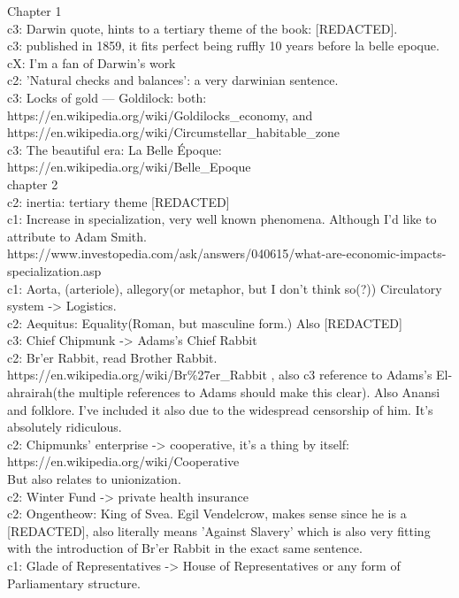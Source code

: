Chapter 1\\[1cm]
c3: Darwin quote, hints to a tertiary theme of the book: [REDACTED].\\
c3: published in 1859, it fits perfect being ruffly 10 years before la belle epoque.\\
cX: I'm a fan of Darwin's work\\
c2: 'Natural checks and balances': a very darwinian sentence.\\
c3: Locks of gold --- Goldilock: both: https://en.wikipedia.org/wiki/Goldilocks\_economy, and https://en.wikipedia.org/wiki/Circumstellar\_habitable\_zone\\
c3: The beautiful era: La Belle Époque: https://en.wikipedia.org/wiki/Belle\_Epoque\\[1cm]
chapter 2 \\
c2: inertia: tertiary theme [REDACTED]\\
c1: Increase in specialization, very well known phenomena. Although I'd like to attribute to Adam Smith.\\ https://www.investopedia.com/ask/answers/040615/what-are-economic-impacts-specialization.asp\\
c1: Aorta, (arteriole), allegory(or metaphor, but I don't think so(?)) Circulatory system -> Logistics.\\
c2: Aequitus: Equality(Roman, but masculine form.) Also [REDACTED]\\
c3: Chief Chipmunk -> Adams's Chief Rabbit\\
c2: Br'er Rabbit, read Brother Rabbit.\\ https://en.wikipedia.org/wiki/Br\%27er\_Rabbit , also c3 reference to Adams's El-ahrairah(the multiple references to Adams should make this clear). Also Anansi and folklore. I've included it also due to the widespread censorship of him. It's absolutely ridiculous.\\
c2: Chipmunks' enterprise -> cooperative, it's a thing by itself:\\
https://en.wikipedia.org/wiki/Cooperative\\
But also relates to unionization.\\
c2: Winter Fund -> private health insurance\\
c2: Ongentheow: King of Svea. Egil Vendelcrow, makes sense since he is a [REDACTED], also literally means 'Against Slavery' which is also very fitting with the introduction of Br'er Rabbit in the exact same sentence.\\
c1: Glade of Representatives -> House of Representatives or any form of Parliamentary structure.\\
